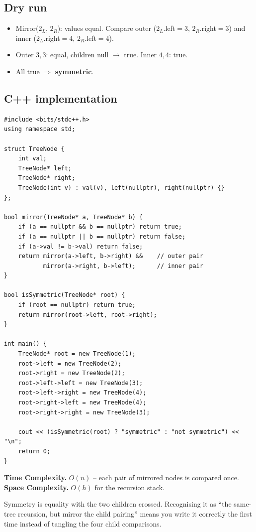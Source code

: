 \subsection*{Dry run}


\begin{itemize}
  \item Mirror($2_L$, $2_R$): values equal. Compare outer
        ($2_L$.left$=3$, $2_R$.right$=3$) and inner ($2_L$.right$=4$,
        $2_R$.left$=4$).
  \item Outer $3,3$: equal, children null $\to$ true. Inner $4,4$: true.
  \item All true $\Rightarrow$ \textbf{symmetric}.
\end{itemize}

\subsection*{C++ implementation}

\begin{lstlisting}
#include <bits/stdc++.h>
using namespace std;

struct TreeNode {
    int val;
    TreeNode* left;
    TreeNode* right;
    TreeNode(int v) : val(v), left(nullptr), right(nullptr) {}
};

bool mirror(TreeNode* a, TreeNode* b) {
    if (a == nullptr && b == nullptr) return true;
    if (a == nullptr || b == nullptr) return false;
    if (a->val != b->val) return false;
    return mirror(a->left, b->right) &&    // outer pair
           mirror(a->right, b->left);      // inner pair
}

bool isSymmetric(TreeNode* root) {
    if (root == nullptr) return true;
    return mirror(root->left, root->right);
}

int main() {
    TreeNode* root = new TreeNode(1);
    root->left = new TreeNode(2);
    root->right = new TreeNode(2);
    root->left->left = new TreeNode(3);
    root->left->right = new TreeNode(4);
    root->right->left = new TreeNode(4);
    root->right->right = new TreeNode(3);

    cout << (isSymmetric(root) ? "symmetric" : "not symmetric") << "\n";
    return 0;
}
\end{lstlisting}

\begin{complexitybox}
\textbf{Time Complexity.} $O(n)$ -- each pair of mirrored nodes is compared
once. \textbf{Space Complexity.} $O(h)$ for the recursion stack.
\end{complexitybox}

\begin{takeawaybox}
Symmetry is equality with the two children crossed. Recognising it as ``the
same-tree recursion, but mirror the child pairing'' means you write it
correctly the first time instead of tangling the four child comparisons.
\end{takeawaybox}
